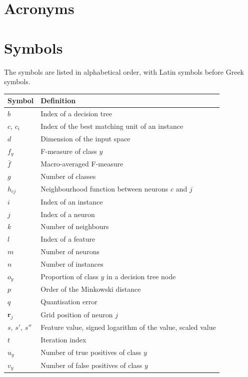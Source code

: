 \documentclass[conference]{IEEEtran}
\newcommand{\vect}[1]{\mathbf{#1}}
\begin{document}
\appendices

\section{Acronyms}
\glsaddall
\printglossary[type=\acronymtype]

\section{Symbols}

The symbols are listed in alphabetical order, with Latin symbols before Greek symbols.

\begin{table}[!h]
\centering
\footnotesize
\begin{tabular}{lp{2.45in}}
\toprule
\textbf{Symbol} & \textbf{Definition} \\
\midrule
$b$ & Index of a decision tree \\
$c$, $c_i$ & Index of the best matching unit of an instance \\
$d$ & Dimension of the input space \\
$f_y$ & F-measure of class $y$ \\
$\bar{f}$ & Macro-averaged F-measure \\
$g$ & Number of classes \\
$h_{cj}$ & Neighbourhood function between neurons $c$ and $j$ \\
$i$ & Index of an instance \\
$j$ & Index of a neuron \\
$k$ & Number of neighbours \\
$l$ & Index of a feature \\
$m$ & Number of neurons \\
$n$ & Number of instances \\
$o_y$ & Proportion of class $y$ in a decision tree node \\
$p$ & Order of the Minkowski distance \\
$q$ & Quantisation error \\
$\vect{r}_j$ & Grid position of neuron $j$ \\
$s$, $s'$, $s''$ & Feature value, signed logarithm of the value, scaled value \\
$t$ & Iteration index \\
$u_y$ & Number of true positives of class $y$ \\
$v_y$ & Number of false positives of class $y$ \\

\end{tabular}
\end{table}
\end{document}
